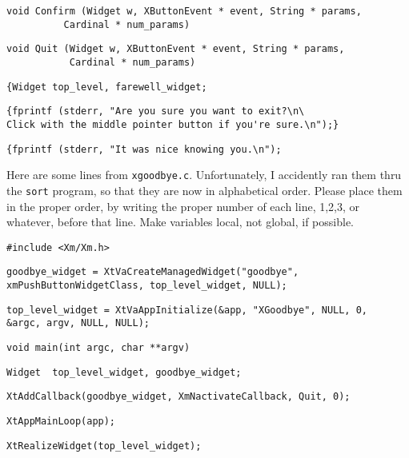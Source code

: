 \documentclass[twoside]{article}
\begin{document}
\begin{enumerate}
\begin{enumerate}
\begin{verbatim}
void Confirm (Widget w, XButtonEvent * event, String * params, 
	      Cardinal * num_params)
\end{verbatim}
\itemsp
\begin{verbatim}
void Quit (Widget w, XButtonEvent * event, String * params, 
           Cardinal * num_params)
\end{verbatim}
\itemsp
\begin{verbatim}
{Widget top_level, farewell_widget;
\end{verbatim}
\itemsp
\begin{verbatim}
{fprintf (stderr, "Are you sure you want to exit?\n\
Click with the middle pointer button if you're sure.\n");}
\end{verbatim}
\itemsp
\begin{verbatim}
{fprintf (stderr, "It was nice knowing you.\n");
\end{verbatim}
\end{enumerate}

 Here are some lines from \texttt{xgoodbye.c}.
Unfortunately, I accidently ran them thru the \texttt{sort}
program, so that they are now in alphabetical order.  Please
place them in the proper order, by writing the proper number of
each line, 1,2,3, or whatever, before that line.   Make variables
local, not global, if possible.
\begin{enumerate}

\itemsp
\begin{verbatim}
#include <Xm/Xm.h>
\end{verbatim}
\itemsp
\begin{verbatim}
goodbye_widget = XtVaCreateManagedWidget("goodbye",
xmPushButtonWidgetClass, top_level_widget, NULL); 
\end{verbatim}
\itemsp
\begin{verbatim}
top_level_widget = XtVaAppInitialize(&app, "XGoodbye", NULL, 0,
&argc, argv, NULL, NULL); 
\end{verbatim}
\itemsp
\begin{verbatim}
void main(int argc, char **argv)
\end{verbatim}
\itemsp
\begin{verbatim}
Widget  top_level_widget, goodbye_widget;
\end{verbatim}
\itemsp
\begin{verbatim}
XtAddCallback(goodbye_widget, XmNactivateCallback, Quit, 0);
\end{verbatim}
\itemsp
\begin{verbatim}
XtAppMainLoop(app);     
\end{verbatim}
\itemsp
\begin{verbatim}
XtRealizeWidget(top_level_widget);
\end{verbatim}
\end{enumerate}


\end{enumerate}
\end{document}
